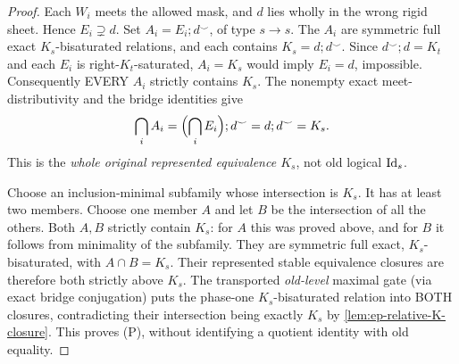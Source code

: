 \begin{proof}
Each \(W_i\) meets the allowed mask, and \(d\) lies wholly
in the wrong rigid sheet. Hence \(E_i\supsetneq d\).
Set \(A_i=E_i;d^\smile\), of type \(s\to s\).
The \(A_i\) are symmetric full exact \(K_s\)-bisaturated
relations, and each contains \(K_s=d;d^\smile\).
Since \(d^\smile;d=K_t\) and each \(E_i\) is
right-\(K_t\)-saturated,
\(A_i=K_s\) would imply \(E_i=d\), impossible.
Consequently EVERY \(A_i\) strictly contains \(K_s\).
The nonempty exact meet-distributivity and the bridge
identities give
\[
 \bigcap_iA_i=
 \Bigl(\bigcap_iE_i\Bigr);d^\smile
       =d;d^\smile=K_s .
\]
This is the \emph{whole original represented
equivalence \(K_s\)}, not old logical \(\mathrm{Id}_s\).

Choose an inclusion-minimal subfamily whose intersection is
\(K_s\). It has at least two members. Choose one member
\(A\) and let \(B\) be the intersection of all the others.
Both \(A,B\) strictly contain \(K_s\):
for \(A\) this was proved above, and for \(B\) it follows
from minimality of the subfamily. They are symmetric full
exact, \(K_s\)-bisaturated, with \(A\cap B=K_s\).
Their represented stable equivalence closures are therefore
both strictly above \(K_s\). The transported
\emph{old-level} maximal gate (via exact bridge conjugation)
puts the phase-one \(K_s\)-bisaturated relation into BOTH
closures, contradicting their intersection being exactly
\(K_s\) by \cref{lem:ep-relative-K-closure}.
This proves (P), without identifying a quotient
identity with old equality.
\end{proof}

